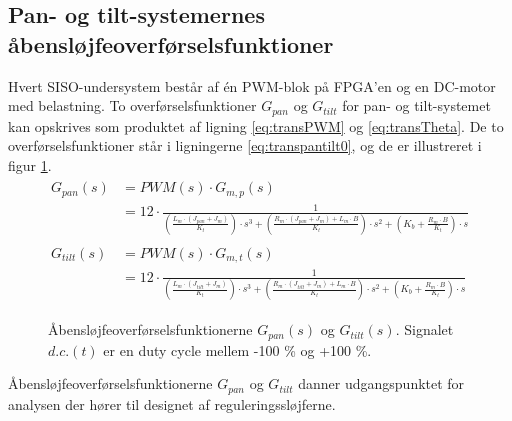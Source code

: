 \subsection{Pan- og tilt-systemernes åbensløjfeoverførselsfunktioner}
Hvert SISO-undersystem består af én PWM-blok på FPGA'en og en DC-motor med belastning.
To overførselsfunktioner \(G_{pan}\) og \(G_{tilt}\) for pan- og tilt-systemet kan opskrives
som produktet af ligning \ref{eq:transPWM} og \ref{eq:transTheta}. De to overførselsfunktioner
står i ligningerne \ref{eq:transpantilt0}, og de er illustreret i figur \ref{fig:openloop1}.
\begin{align}
\label{eq:transpantilt0}
\begin{split}
	G_{pan}\left(s\right)&=PWM\left(s\right)\cdot{}G_{m,p}\left(s\right)\\
	&=12\cdot{}\frac{1}
			{\left(\frac{L_m\cdot{}\left(J_{pan}+J_m\right)}{K_t}\right)\cdot{}s^3
			+\left(\frac{R_m\cdot{}\left(J_{pan}+J_m\right)+L_m\cdot{}B}{K_t}\right)\cdot{}s^2
			+\left(K_b+\frac{R_m\cdot{}B}{K_t}\right)\cdot{}s}
	\\
	\\
	G_{tilt}\left(s\right)&=PWM\left(s\right)\cdot{}G_{m,t}\left(s\right)\\
	&=12\cdot{}\frac{1}
			{\left(\frac{L_m\cdot{}\left(J_{tilt}+J_m\right)}{K_t}\right)\cdot{}s^3
			+\left(\frac{R_m\cdot{}\left(J_{tilt}+J_m\right)+L_m\cdot{}B}{K_t}\right)\cdot{}s^2
			+\left(K_b+\frac{R_m\cdot{}B}{K_t}\right)\cdot{}s}
\end{split}
\end{align}
\begin{figure}[!th]
\centering
\begin{tikzpicture}[auto, node distance=2.6cm,>=latex']

\end{tikzpicture}
\caption[Åbensløjfeoverførselsfunktioner]{Åbensløjfeoverførselsfunktionerne \(G_{pan}\left(s\right)\) og \(G_{tilt}\left(s\right)\).
	Signalet \(d.c.\left(t\right)\) er en duty cycle mellem -100 \% og +100 \%.}
\label{fig:openloop1}
\end{figure}

Åbensløjfeoverførselsfunktionerne \(G_{pan}\) og \(G_{tilt}\) danner udgangspunktet
for analysen der hører til designet af reguleringssløjferne.
